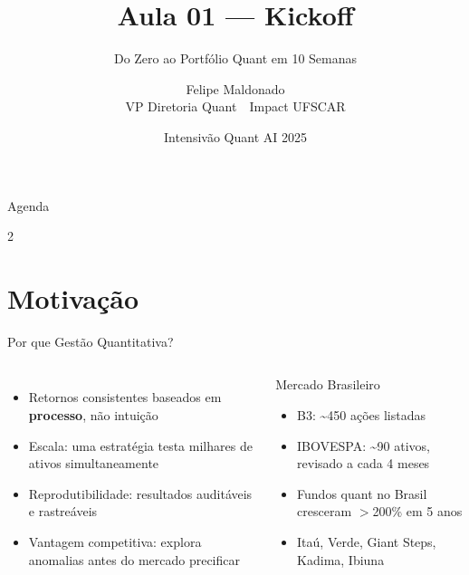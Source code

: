 \documentclass[aspectratio=169,12pt]{beamer}
\author{Felipe Maldonado\\{\scriptsize VP Diretoria Quant~\textbullet{}~Impact UFSCAR}}
\date{Intensiv\~{a}o Quant AI 2025}
\title{Aula 01 --- Kickoff}
\subtitle{Do Zero ao Portfólio Quant em 10 Semanas}
\begin{document}
\begin{frame}[plain]
\titlepage
\end{frame}

\begin{frame}[fragile]{Agenda}

\begin{multicols}{2}
\tableofcontents
\end{multicols}
\end{frame}

\section{Motivação}
\begin{frame}[fragile]{Por que Gestão Quantitativa?}
\begin{columns}[T]
\begin{itemize}
  \item Retornos consistentes baseados em \textbf{processo}, não intuição
  \item Escala: uma estratégia testa \alert{milhares} de ativos simultaneamente
  \item Reprodutibilidade: resultados auditáveis e rastreáveis
  \item Vantagem competitiva: explora anomalias antes do mercado precificar
\end{itemize}
\begin{block}{Mercado Brasileiro}
\begin{itemize}
  \item B3: \textasciitilde 450 ações listadas
  \item IBOVESPA: \textasciitilde 90 ativos, revisado a cada 4 meses
  \item Fundos quant no Brasil cresceram $>$200\% em 5 anos
  \item Itaú, Verde, Giant Steps, Kadima, Ibiuna
\end{itemize}
\end{block}
\end{columns}
\end{frame}
\end{document}
